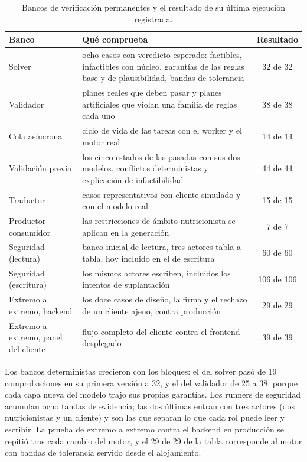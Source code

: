 \begin{table}[htbp]
\centering
\small
\begin{tabular}{|p{3.2cm}|p{8.2cm}|c|}
\hline
\textbf{Banco} & \textbf{Qué comprueba} & \textbf{Resultado} \\
\hline
Solver & ocho casos con veredicto esperado: factibles, infactibles con núcleo, garantías de las reglas base y de plausibilidad, bandas de tolerancia & 32 de 32 \\
\hline
Validador & planes reales que deben pasar y planes artificiales que violan una familia de reglas cada uno & 38 de 38 \\
\hline
Cola asíncrona & ciclo de vida de las tareas con el worker y el motor real & 14 de 14 \\
\hline
Validación previa & los cinco estados de las pasadas con sus dos modelos, conflictos deterministas y explicación de infactibilidad & 44 de 44 \\
\hline
Traductor & casos representativos con cliente simulado y con el modelo real & 15 de 15 \\
\hline
Productor-consumidor & las restricciones de ámbito nutricionista se aplican en la generación & 7 de 7 \\
\hline
Seguridad (lectura) & banco inicial de lectura, tres actores tabla a tabla, hoy incluido en el de escritura & 60 de 60 \\
\hline
Seguridad (escritura) & los mismos actores escriben, incluidos los intentos de suplantación & 106 de 106 \\
\hline
Extremo a extremo, backend & los doce casos de diseño, la firma y el rechazo de un cliente ajeno, contra producción & 29 de 29 \\
\hline
Extremo a extremo, panel del cliente & flujo completo del cliente contra el frontend desplegado & 39 de 39 \\
\hline
\end{tabular}
\caption{Bancos de verificación permanentes y el resultado de su última ejecución registrada.}
\label{tab:bancos}
\end{table}

Los bancos deterministas crecieron con los bloques: el del solver pasó de 19 comprobaciones en su primera versión a 32, y el del validador de 25 a 38, porque cada capa nueva del modelo trajo sus propias garantías. Los runners de seguridad acumulan ocho tandas de evidencia; las dos últimas entran con tres actores (dos nutricionistas y un cliente) y son las que separan lo que cada rol puede leer y escribir. La prueba de extremo a extremo contra el backend en producción se repitió tras cada cambio del motor, y el 29 de 29 de la tabla corresponde al motor con bandas de tolerancia servido desde el alojamiento.


